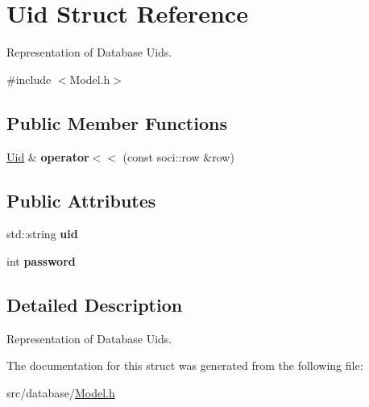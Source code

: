 \hypertarget{struct_uid}{\section{Uid Struct Reference}
\label{struct_uid}
}


Representation of Database Uids.  




{\ttfamily \#include $<$Model.\-h$>$}

\subsection*{Public Member Functions}
\begin{DoxyCompactItemize}
\item 
\hypertarget{struct_uid_a678e836ad6be91ab8c54256dae008dbc}{\hyperlink{struct_uid}{Uid} \& {\bfseries operator$<$$<$} (const soci\-::row \&row)}\label{struct_uid_a678e836ad6be91ab8c54256dae008dbc}

\end{DoxyCompactItemize}
\subsection*{Public Attributes}
\begin{DoxyCompactItemize}
\item 
\hypertarget{struct_uid_a06083e5b6d89d5849d66f2a9b05ef24a}{std\-::string {\bfseries uid}}\label{struct_uid_a06083e5b6d89d5849d66f2a9b05ef24a}

\item 
\hypertarget{struct_uid_a77b744a0d32628c76b368901e6a8d377}{int {\bfseries password}}\label{struct_uid_a77b744a0d32628c76b368901e6a8d377}

\end{DoxyCompactItemize}


\subsection{Detailed Description}
Representation of Database Uids. 

The documentation for this struct was generated from the following file\-:\begin{DoxyCompactItemize}
\item 
src/database/\hyperlink{_model_8h}{Model.\-h}\end{DoxyCompactItemize}
